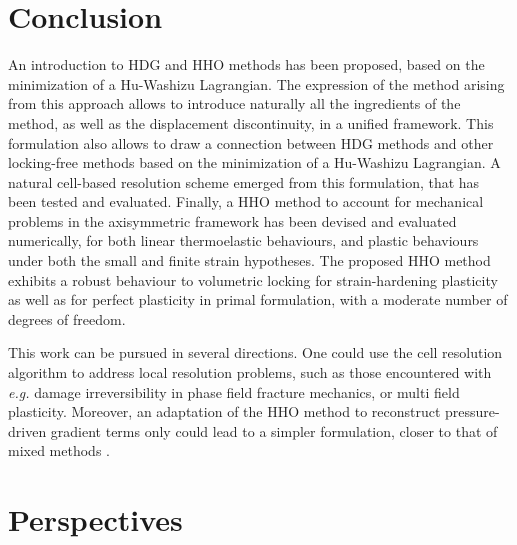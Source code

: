 
\section{Conclusion}


An introduction to HDG and HHO methods has been proposed, based on the minimization of a Hu-Washizu Lagrangian. The expression of the method arising from this approach allows to introduce naturally all the ingredients of the method, as well as the displacement discontinuity, in a unified framework.
This formulation also allows to draw a connection between HDG methods and other locking-free methods based on the minimization of a Hu-Washizu Lagrangian.
A natural cell-based resolution scheme emerged from this formulation, that has been tested and evaluated.
Finally, a HHO method to account for mechanical problems in the axisymmetric framework has been devised and evaluated numerically, for both linear thermoelastic behaviours, and plastic behaviours under both the small and finite strain hypotheses.
The proposed HHO method exhibits a robust behaviour to volumetric locking for strain-hardening plasticity as well as for perfect plasticity in primal formulation, with a moderate number of degrees of freedom.

This work can be pursued in several directions. One could use the cell resolution algorithm to address local resolution problems, such as those encountered with \textit{e.g.} damage irreversibility in phase field fracture mechanics, or multi field plasticity. Moreover, an adaptation of the HHO method to
reconstruct pressure-driven gradient terms only could lead to a simpler formulation, closer to that of mixed methods \cite{simo_quasi-incompressible_1991}.

\section{Perspectives}